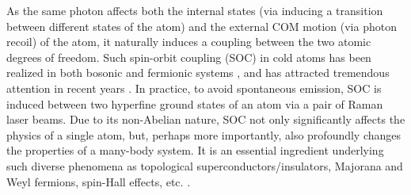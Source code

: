 \documentclass[atoms,article,submit,moreauthors,dvi2pdf,12pt,a4paper]{mdpi}
\begin{document}

As the same photon affects both the internal states (via inducing a transition between different states of the atom) and the external COM motion (via photon recoil) of the atom, it naturally induces a coupling between the two atomic degrees of freedom. Such spin-orbit coupling (SOC) in cold atoms has been realized in both bosonic \cite{soc1, soc2} and fermionic systems \cite{soc3, soc4}, and has attracted tremendous attention in recent years \cite{socVictor}. In practice, to avoid spontaneous emission, SOC is induced between two hyperfine ground states of an atom via a pair of Raman laser beams. Due to its non-Abelian nature, SOC not only significantly affects the physics of a single atom, but, perhaps more importantly, also profoundly changes the properties of a many-body system. It is an essential ingredient underlying such diverse phenomena as topological superconductors/insulators, Majorana and Weyl fermions, spin-Hall effects, etc. \cite{TI, MF, WF, SHE1, SHE2}.
\end{document}
